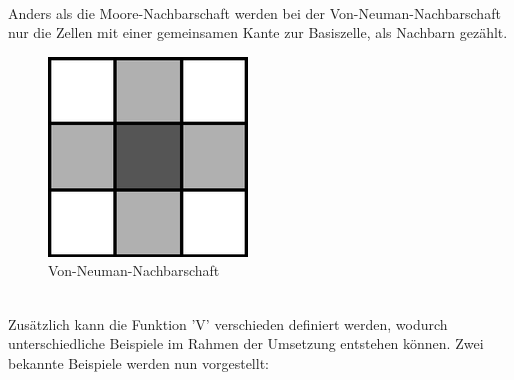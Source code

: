 \documentclass[../mciAusarbeitung.tex]{subfiles}
\begin{document}
         
            
            $~$ \\Anders als die Moore-Nachbarschaft werden bei der Von-Neuman-Nachbarschaft nur die Zellen mit einer gemeinsamen Kante zur Basiszelle, als Nachbarn gezählt.\\
            
 \begin{figure}[H]
\centering
            \includegraphics[width=0.5\linewidth]{"2..png"}

\caption{Von-Neuman-Nachbarschaft}
\end{figure}            

 
           $~$ \\Zusätzlich kann die Funktion 'V' verschieden definiert werden, wodurch unterschiedliche Beispiele im Rahmen der Umsetzung entstehen können. Zwei bekannte Beispiele werden nun vorgestellt:
            
\end{document}
